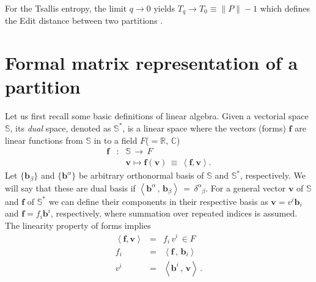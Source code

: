 \documentclass[twocolumn,aps,sort,nofootinbib]{revtex4}
\begin{document}
\begin{appendix}
For the Tsallis entropy, the limit
$q\rightarrow 0$ yields $T_q\rightarrow T_0\equiv\|P\|-1$ %
which defines the Edit distance between two partitions \cite{Brown07}.
\figentropymixing

\section{Formal matrix representation of a partition}
Let us first recall some basic definitions of linear algebra.
Given a vectorial space $\mathbb{S}$, its {\it dual} space, denoted as $\mathbb{S^*}$, is a
linear space where the vectors (forms)
$\mathbf{f}$ are linear functions from $\mathbb{S}$ in to a field $F$($=\mathbb{R},\,\mathbb{C}$)
\begin{eqnarray}
\mathbf{f} &:& \mathbb{S}\,\rightarrow\,F \\
 & & \mathbf{v} \mapsto \mathbf{f}(\mathbf{v})\,\equiv\,\left<\mathbf{f},\mathbf{v}\right>. \nonumber
\label{form}
\end{eqnarray}
Let $\{\mathbf{b}_\beta\}$ and $\{\mathbf{b}^\alpha\}$ be arbitrary orthonormal basis 
of $\mathbb{S}$ and $\mathbb{S^*}$, respectively.
We will say that these are dual basis if
$
\left< \mathbf{b}^\alpha\,,\,\mathbf{b}_\beta\right>\,=\,\delta^\alpha_{\phantom{\alpha}\beta}.
$
For a general vector $\mathbf{v}$ of $\mathbb{S}$ and $\mathbf{f}$ of $\mathbb{S^*}$ we
can define their components in their respective basis as 
$\mathbf{v}=v^i\mathbf{b}_i$ and $\mathbf{f}=f_i\mathbf{b}^i$, respectively, 
where summation over repeated indices
is assumed. The linearity property of forms implies
\begin{eqnarray*}
\left<\mathbf{f},\mathbf{v}\right> &=& f_i\,v^i \,\in F \\
f_i &=& \left<\mathbf{f}\,,\,\mathbf{b}_i\right> \\
v^i &=& \left<\mathbf{b}^i\,,\,\mathbf{v}\right> \, .
\end{eqnarray*}


\end{appendix}
\end{document}
